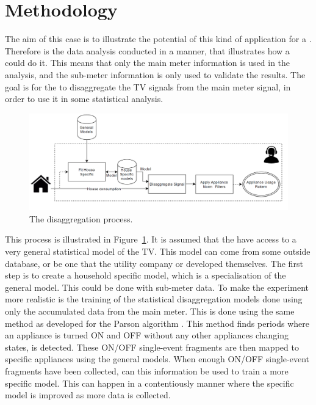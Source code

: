 \section{Methodology}
The aim of this case is to illustrate the potential of this kind of application for a . Therefore is the data analysis conducted in a manner, that illustrates how a  could do it. This means that only the main meter information is used in the analysis, and the sub-meter information is only used to validate the results.  The goal is for the  to disaggregate the TV signals from the main meter signal, in order to use it in some statistical analysis. 

\begin{figure}[H]
\centering
\includegraphics[width=1\textwidth]{billeder/Electric company method.png}
\caption{The disaggregation process.}
\label{fig:ECM}
\end{figure}

This process is illustrated in Figure~\ref{fig:ECM}. It is assumed that the  have access to a very general statistical model of the TV. This model can come from some outside database, or be one that the utility company or  developed themselves. The first step is to create a household specific model, which is a specialisation of the general model. This could be done with sub-meter data. To make the experiment more realistic is the training of the statistical disaggregation models done using only the accumulated data from the main meter. This is done using the same method as developed for the Parson algorithm \citep{RefWorks:28}. This method finds periods where an appliance is turned ON and OFF without any other appliances changing states, is detected. These ON/OFF single-event fragments are then mapped to specific appliances using the general models. When enough ON/OFF single-event fragments have been collected, can this information be used to train a more specific model. This can happen in a contentiously manner where the specific model is improved as more data is collected.  

